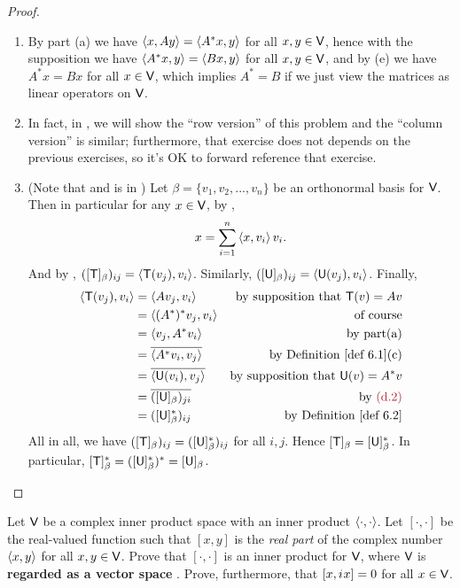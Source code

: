 \begin{proof}
\begin{enumerate}
\item By part (a) we have \(\left< x, Ay \right> = \left< A^* x, y \right>\) for all \(x, y \in \textsf{V}\), hence with the supposition we have \(\left< A^* x, y \right> = \left< B x, y \right>\) for all \(x, y \in \textsf{V}\), and by (e) we have \(A^* x = B x\) for all \(x \in \textsf{V}\), which implies \(A^* = B\) if we just view the matrices as linear operators on \(\textsf{V}\).

\item In fact, in , we will show the ``row version'' of this problem and the ``column version'' is similar;
furthermore, that exercise does not depends on the previous exercises, so it's OK to forward reference that exercise.

\item (Note that  and  is in )
Let \(\beta = \{ v_1, v_2, ..., v_n \}\) be an orthonormal basis for \(\textsf{V}\).
Then in particular for any \(x \in \textsf{V}\), by ,
\[
    x = \sum_{i = 1}^n \left< x, v_i \right> v_i.
\]
And by , \(([\textsf{T}]_{\beta})_{ij} = \left< \textsf{T}(v_j), v_i \right>\). 
Similarly, \(([\textsf{U}]_{\beta})_{ij} = \left< \textsf{U}(v_j), v_i \right>\). 
Finally,
\begin{align*}
    \LG \T(v_j), v_i \RG & = \LG A v_j, v_i \RG & \text{by supposition that \(\T(v) = Av\)} \\
        & = \LG (A^*)^* v_j, v_i \RG & \text{of course} \\
        & = \LG v_j, A^* v_i \RG & \text{by part(a)} \\
        & = \conjugatet{\LG A^* v_i, v_j \RG} & \text{by \DEF{6.1}(c)} \\
        & = \conjugatet{\LG \U(v_i), v_j \RG} & \text{by supposition that \(\U(v) = A^*v\)} \\
        & = \conjugatet{([\U]_{\beta})_{ji}} & \text{by \MAROON{(d.2)}} \\
        & = ([\U]_{\beta}^*)_{ij} & \text{by \DEF{6.2}}
\end{align*}
All in all, we have \(([\textsf{T}]_{\beta})_{ij} = ([\textsf{U}]_{\beta}^*)_{ij}\) for all \(i, j\).
Hence \([\textsf{T}]_{\beta} = [\textsf{U}]_{\beta}^*\).
In particular, \([\textsf{T}]_{\beta}^* = ([\textsf{U}]_{\beta}^*)^* = [\textsf{U}]_{\beta}\).
\end{enumerate}
\end{proof}

\begin{exercise} \label{exercise 6.1.24}
Let \(\textsf{V}\) be a complex inner product space with an inner product \(\left< \cdot, \cdot \right>\).
Let \([ \cdot, \cdot ]\) be the real-valued function such that \([x, y]\) is the \emph{real part} of the complex number \(\left< x, y \right>\) for all \(x, y \in \textsf{V}\).
Prove that \([ \cdot, \cdot ]\) is an inner product for \(\textsf{V}\), where \(\textsf{V}\) is \textbf{regarded as a vector space }.
Prove, furthermore, that \([x, {i\mkern1mu} x] = 0\) for all \(x \in \textsf{V}\).
\end{exercise}

